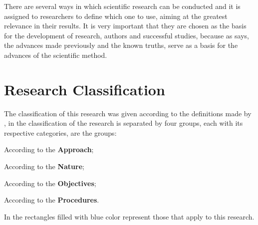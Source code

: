 
There are several ways in which scientific research can be conducted and it is assigned to researchers to define which one to use, aiming at the greatest relevance in their results. 
It is very important that they are chosen as the basis for the development of research, authors and successful studies, because as \textcite{dampier_wilson} says, the advances made previously and the known truths, serve as a basis for the advances of the scientific method.


\section{Research Classification}\label{sec:met-classification}


The classification of this research was given according to the definitions made by \textcite{Prodanov:2013}, in  the classification of the research is separated by four groups, each with its respective categories, are the groups: 
\begin{inparaenum}[(i)]
  \item According to the \textbf{Approach};
  \item According to the \textbf{Nature};
  \item According to the \textbf{Objectives};
  \item According to the \textbf{Procedures}.
\end{inparaenum}
In  the rectangles filled with blue color represent those that apply to this research. 

